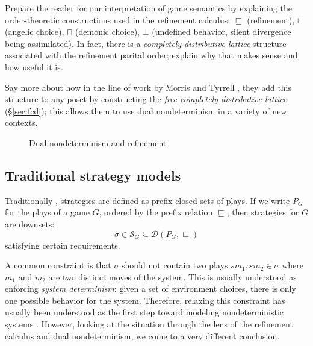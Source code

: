 \documentclass[format=sigplan,authordraft]{acmart}
\begin{document}
Prepare the reader for
our interpretation of game semantics
by explaining the order-theoretic constructions used
in the refinement calculus:
$\sqsubseteq$ (refinement),
$\sqcup$ (angelic choice),
$\sqcap$ (demonic choice),
$\bot$ (undefined behavior, silent divergence being assimilated).
In fact,
there is a \emph{completely distributive lattice} structure
associated with the refinement parital order;
explain why that makes sense
and how useful it is.

Say more about how in the line of work by Morris and Tyrrell
\cite{augtyp,dndf,cspdnd},
they add this structure to any poset
by constructing the
\emph{free completely distributive lattice} (\S\ref{sec:fcd});
this allows them to use dual nondeterminism
in a variety of new contexts.


\begin{figure}[h]
  \caption{Dual nondeterminism and refinement}
\end{figure}

\subsection{Traditional strategy models} \label{sec:strat} %

Traditionally \cite{gamesem99},
strategies are defined as
prefix-closed sets of plays.
If we write $P_G$ for the plays of a game $G$,
ordered by the prefix relation $\sqsubseteq$,
then strategies for $G$ are downsets:
\[
    \sigma \in
      \mathcal{S}_G \subseteq
      \mathcal{D}(P_G, {\sqsubseteq})
\]
satisfying certain requirements.

A common constraint is that $\sigma$
should not contain two plays $s m_1, s m_2 \in \sigma$
where $m_1$ and $m_2$ are two distinct moves of the system.
This is usually understood as
enforcing \emph{system determinism}:
given a set of environment choices,
there is only one possible behavior for the system.
Therefore,
relaxing this constraint has usually been understood
as the first step toward modeling nondeterministic systems
\cite{gsnondet}.
However,
looking at the situation through the lens of
the refinement calculus and dual nondeterminism,
we come to a very different conclusion.
\end{document}
